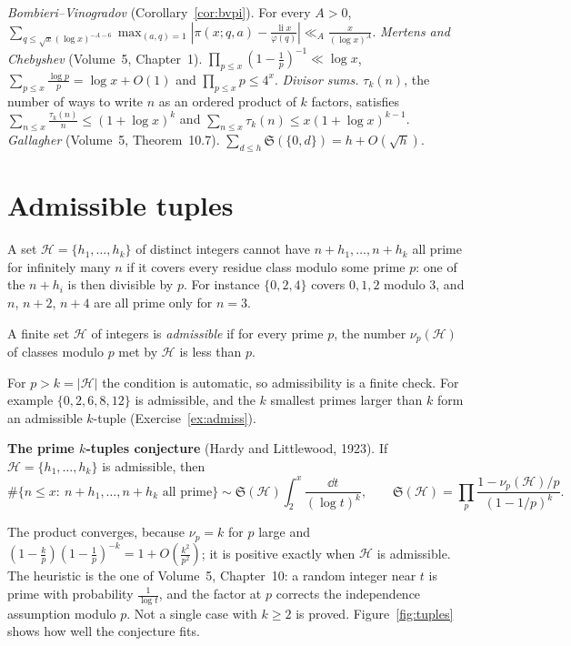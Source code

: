 \begin{reminder}
\emph{Bombieri--Vinogradov} (Corollary~\ref{cor:bvpi}). For every $A>0$, $\sum_{q\le\sqrt x(\log x)^{-A-6}}\max_{(a,q)=1}|\pi(x;q,a)-\frac{\operatorname{li}x}{\varphi(q)}|\ll_A\frac x{(\log x)^A}$.
\emph{Mertens and Chebyshev} (Volume~5, Chapter~1). $\prod_{p\le x}(1-\frac1p)^{-1}\ll\log x$, $\sum_{p\le x}\frac{\log p}p=\log x+O(1)$ and $\prod_{p\le x}p\le4^x$.
\emph{Divisor sums.} $\tau_k(n)$, the number of ways to write $n$ as an ordered product of $k$ factors, satisfies $\sum_{n\le x}\frac{\tau_k(n)}n\le(1+\log x)^k$ and $\sum_{n\le x}\tau_k(n)\le x(1+\log x)^{k-1}$.
\emph{Gallagher} (Volume~5, Theorem~10.7). $\sum_{d\le h}\mathfrak S(\{0,d\})=h+O(\sqrt h)$.
\end{reminder}

\section{Admissible tuples}

A set $\mathcal H=\{h_1,\dots,h_k\}$ of distinct integers cannot have $n+h_1,\dots,n+h_k$ all prime for infinitely many $n$ if it covers every residue class modulo some prime $p$: one of the $n+h_i$ is then divisible by $p$. For instance $\{0,2,4\}$ covers $0,1,2$ modulo $3$, and $n$, $n+2$, $n+4$ are all prime only for $n=3$.

\begin{definition}\label{def:admissible}
A finite set $\mathcal H$ of integers is \emph{admissible} if for every prime $p$, the number $\nu_p(\mathcal H)$ of classes modulo $p$ met by $\mathcal H$ is less than $p$.
\end{definition}

For $p>k=|\mathcal H|$ the condition is automatic, so admissibility is a finite check. For example $\{0,2,6,8,12\}$ is admissible, and the $k$ smallest primes larger than $k$ form an admissible $k$-tuple (Exercise~\ref{ex:admiss}).

\medskip\noindent\textbf{The prime $k$-tuples conjecture} (Hardy and Littlewood, 1923). If $\mathcal H=\{h_1,\dots,h_k\}$ is admissible, then
\[
\#\{n\le x:\ n+h_1,\dots,n+h_k\text{ all prime}\}\sim\mathfrak S(\mathcal H)\int_2^x\frac{\dd t}{(\log t)^k},\qquad\mathfrak S(\mathcal H)=\prod_p\frac{1-\nu_p(\mathcal H)/p}{(1-1/p)^k}.
\]
\medskip

The product converges, because $\nu_p=k$ for $p$ large and $(1-\frac kp)(1-\frac1p)^{-k}=1+O(\frac{k^2}{p^2})$; it is positive exactly when $\mathcal H$ is admissible. The heuristic is the one of Volume~5, Chapter~10: a random integer near $t$ is prime with probability $\frac1{\log t}$, and the factor at $p$ corrects the independence assumption modulo $p$. Not a single case with $k\ge2$ is proved. Figure~\ref{fig:tuples} shows how well the conjecture fits.

